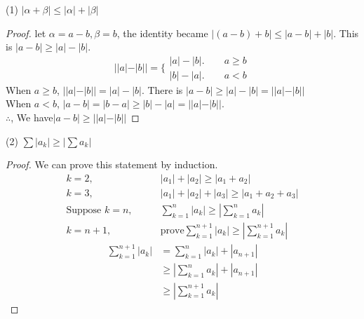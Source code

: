 \begin{example}
	(1) $ |\alpha + \beta | \leqslant |\alpha| + |\beta|$
	\begin{proof}
		let $ \alpha = a-b, \beta = b $, the identity became $ |(a-b) + b| \leqslant |a-b| + |b| $. This is $ |a - b| \ge |a| - |b| $.
		\begin{equation*}
			||a| - |b|| = \Big\lbrace %
			\begin{aligned}
				|a| - |b|. \qquad a \ge b\\
				|b| - |a|. \qquad a < b
			\end{aligned}
		\end{equation*}
		When $ a\ge b $, $ ||a| - |b|| = |a| - |b| $. There is $ |a-b| \ge |a| - |b| = ||a|-|b|| $\\
		When $ a < b $, $ |a-b| = |b-a| \ge |b| - |a|  = ||a|-|b|| $.\\
		$ \therefore $, We have$ |a-b| \ge ||a|-|b|| $
	\end{proof}
		
	(2) $ \sum |a_k| \ge |\sum a_k|$ 
	\begin{proof}
		We can prove this statement by induction.
		\begin{align*}
			k=2,\qquad&|a_1| + |a_2| \ge |a_1+a_2|\\
			k=3,\qquad&|a_1| + |a_2| + |a_3| \ge |a_1+a_2+a_3|\\
			\text{Suppose } k = n, \qquad & \sum_{k=1}^n |a_k| \ge |\sum_{k=1}^n a_k| \\
			k = n+1, \qquad& \text{prove}\sum_{k=1}^{n+1} |a_k| \ge |\sum_{k=1}^{n+1} a_k|
		\end{align*}
		\begin{align*}
			\sum_{k=1}^{n+1} |a_k| 
			&= \sum_{k=1}^{n} |a_k| + |a_{n+1}| \\
			&\ge |\sum_{k=1}^n a_k| + |a_{n+1}| \\
			&\ge |\sum_{k=1}^{n+1} a_k|
		\end{align*}
	

\end{proof}
\end{example}
